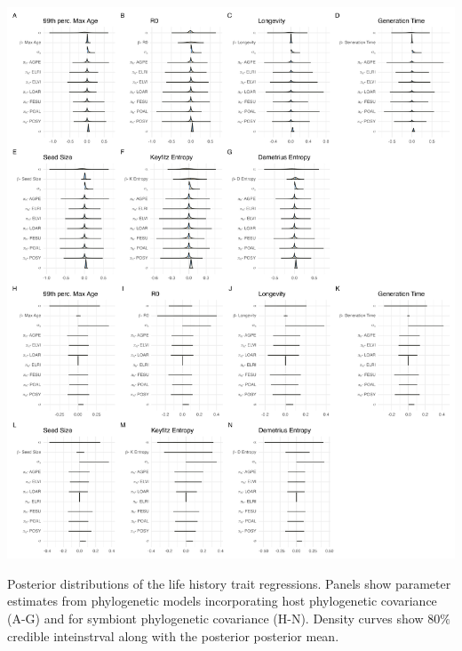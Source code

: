 \documentclass[lineno, sn-basic]{sn-jnl}%
\begin{document}
\begin{myfigure}[H]
	\centering
	\includegraphics[width=\linewidth]{lh_allposteriors_plot.png}
	\caption[Posterior distributions of the life history trait regressions]{Posterior distributions of the life history trait regressions. Panels show parameter estimates from phylogenetic models incorporating host phylogenetic covariance (A-G) and for symbiont phylogenetic covariance (H-N). Density curves show $80\%$ credible inteinstrval along with the posterior posterior mean.}
\end{myfigure}
\end{document}
